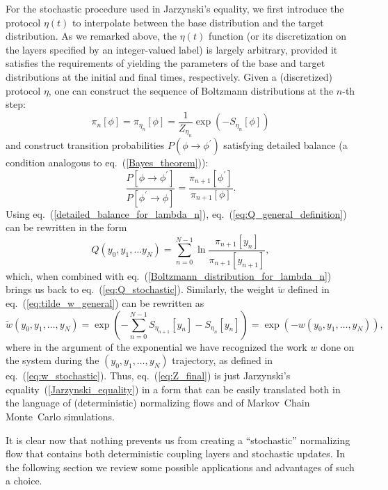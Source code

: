 \documentclass[11pt]{article}
\begin{document}
For the stochastic procedure used in Jarzynski's equality, we first introduce the protocol $\eta(t)$ to interpolate between the base distribution and the target distribution. As we remarked above, the $\eta(t)$ function (or its discretization on the layers specified by an integer-valued label) is largely arbitrary, provided it satisfies the requirements of yielding the parameters of the base and target distributions at the initial and final times, respectively. Given a (discretized) protocol $\eta$, one can construct the sequence of Boltzmann distributions at the $n$-th step: 
\begin{equation}
\label{Boltzmann_distribution_for_lambda_n}
\pi_n[\phi] = \pi_{\eta_n}[\phi] = \frac{1}{Z_{\eta_n}} \exp \left( - S_{\eta_n}[\phi]\right)
\end{equation}
and construct transition probabilities $P(\phi \to \phi^\prime)$ satisfying detailed balance (a condition analogous to eq.~(\ref{Bayes_theorem})):
\begin{equation}
\label{detailed_balance_for_lambda_n}
\frac{P[\phi\to\phi^\prime]}{P[\phi^\prime \to \phi]} = \frac{\pi_{n+1}[\phi^\prime]}{\pi_{n+1}[\phi]}.
\end{equation}
Using eq.~(\ref{detailed_balance_for_lambda_n}), eq.~(\ref{eq:Q_general_definition}) can be rewritten in the form
\begin{equation}
Q(y_0, y_1, \dots y_N) = \sum_{n=0}^{N-1} \ln \frac{\pi_{n+1}[y_n]}{\pi_{n+1}[y_{n+1}]},
\end{equation}
which, when combined with eq.~(\ref{Boltzmann_distribution_for_lambda_n}) brings us back to eq.~(\ref{eq:Q_stochastic}). Similarly, the weight $\tilde{w}$ defined in eq.~(\ref{eq:tilde_w_general}) can be rewritten as
\begin{equation}
\label{eq:tilde_w_stochastic}
\tilde{w}(y_0,y_1,\dots , y_N) = \exp \left( - \sum_{n=0}^{N-1} S_{\eta_{n+1}}[y_n]-S_{\eta_{n}}[y_n] \right) = \exp \left( -w(y_0,y_1,\dots , y_N) \right),
\end{equation}
where in the argument of the exponential we have recognized the work $w$ done on the system during the $(y_0,y_1,\dots , y_N)$ trajectory, as defined in eq.~(\ref{eq:w_stochastic}). Thus, eq.~(\ref{eq:Z_final}) is just Jarzynski's equality~(\ref{Jarzynski_equality}) in a form that can be easily translated both in the language of (deterministic) normalizing flows and of Markov~Chain Monte~Carlo simulations.

It is clear now that nothing prevents us from creating a ``stochastic'' normalizing flow that contains both deterministic coupling layers and stochastic updates. In the following section we review some possible applications and advantages of such a choice.
\end{document}
